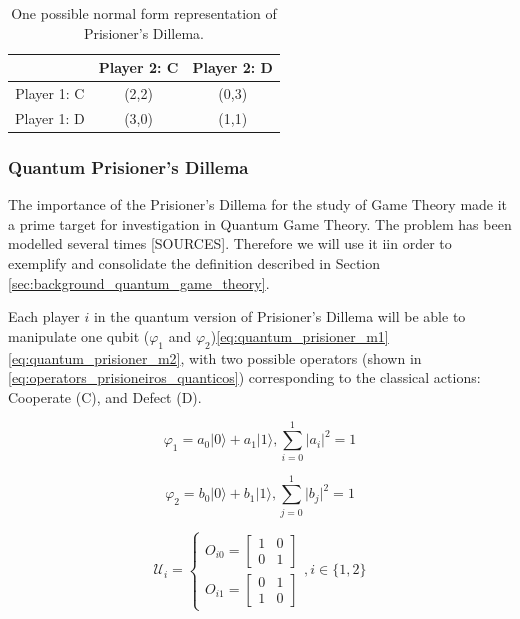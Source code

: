 \begin{center}
\begin{table}
\begin{centering}
\begin{tabular}{ccc}
\hline 
 & Player 2: C & Player 2: D\tabularnewline
\hline 
Player 1: C & (2,2) & (0,3)\tabularnewline
Player 1: D & (3,0) & (1,1)\tabularnewline
\hline 
\end{tabular}
\par\end{centering}

\caption{One possible normal form representation of Prisioner's Dillema.}
\label{tab:prisionersdillema_tab2}
\end{table}
\par\end{center}



\subsubsection{Quantum Prisioner's Dillema}
\label{subsubsec:quantum_prisioners_dillema}

The importance of the Prisioner's Dillema for the study of Game Theory made it a prime target for investigation in Quantum Game Theory. The problem has been modelled several times [SOURCES]. Therefore we will use it iin order to exemplify and consolidate the definition described in Section \ref{sec:background_quantum_game_theory}. 

Each player $i$ in the quantum version of Prisioner's Dillema will be able to manipulate one qubit ($\varphi_{1}$ and $\varphi_{2}$)\ref{eq:quantum_prisioner_m1}\ref{eq:quantum_prisioner_m2}, with two possible operators (shown in \ref{eq:operators_prisioneiros_quanticos}) corresponding to the classical actions: Cooperate (C), and Defect (D). 

\begin{equation}
\label{eq:quantum_prisioner_m1}
\varphi_{1}=a_{0}\vert0\rangle+a_{1}\vert1\rangle,\sum_{i=0}^{1}\vert a_{i}\vert^{2}=1
\end{equation}


\begin{equation}
\label{eq:quantum_prisioner_m2}
\varphi_{2}=b_{0}\vert0\rangle+b_{1}\vert1\rangle,\sum_{j=0}^{1}\vert b_{j}\vert^{2}=1
\end{equation}

\begin{equation}
\label{eq:operators_prisioneiros_quanticos}
\mathcal{U}_{i}=\begin{cases}
O_{i0}=\left[\begin{array}{cc}
1 & 0\\
0 & 1
\end{array}\right]\\
O_{i1}=\left[\begin{array}{cc}
0 & 1\\
1 & 0
\end{array}\right]
\end{cases} , i \in \{ 1, 2 \}
\end{equation}


